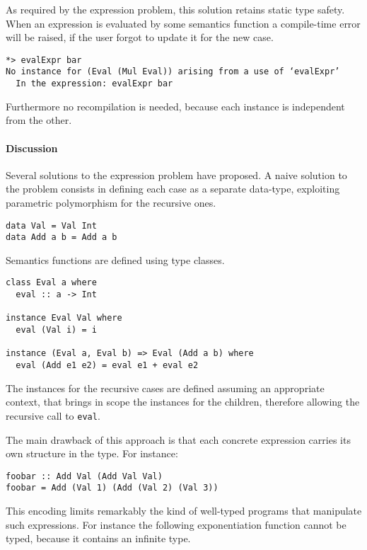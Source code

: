 \documentclass[../Thesis.tex]{subfiles}
\begin{document}
As required by the expression problem, this solution retains static type safety. When an expression is evaluated by some semantics function a compile-time error will be raised, if the user forgot to update it for the new case.

\begin{verbatim}
*> evalExpr bar
No instance for (Eval (Mul Eval)) arising from a use of ‘evalExpr’
  In the expression: evalExpr bar
\end{verbatim}

Furthermore no recompilation is needed, because each instance is independent from the other.

\paragraph{Discussion}
Several solutions to the expression problem have proposed.
A naive solution to the problem consists in defining each case as a separate data-type, exploiting parametric polymorphism for the recursive ones.

\begin{verbatim}
data Val = Val Int
data Add a b = Add a b
\end{verbatim}

Semantics functions are defined using type classes.

\begin{verbatim}
class Eval a where
  eval :: a -> Int

instance Eval Val where
  eval (Val i) = i

instance (Eval a, Eval b) => Eval (Add a b) where
  eval (Add e1 e2) = eval e1 + eval e2
\end{verbatim}

The instances for the recursive cases are defined assuming an appropriate 
context, that brings in scope the instances for the children, therefore allowing
the recursive call to \texttt{eval}.

The main drawback of this approach is that each concrete expression carries
its own structure in the type. For instance:

\begin{verbatim}
foobar :: Add Val (Add Val Val)
foobar = Add (Val 1) (Add (Val 2) (Val 3))
\end{verbatim}

This encoding limits remarkably the kind of well-typed programs that 
manipulate such expressions. For instance the following exponentiation function cannot be typed, because it contains an infinite type.
\end{document}
